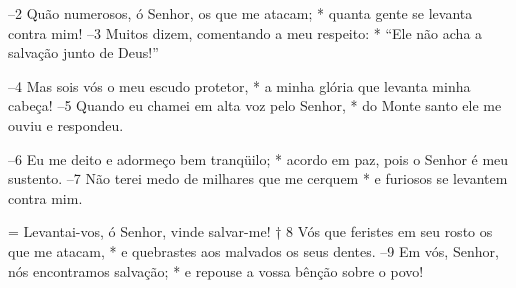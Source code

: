 –2 Quão numerosos, ó Senhor, os que me atacam; *
quanta gente se levanta contra mim! 
–3 Muitos dizem, comentando a meu respeito: *
“Ele não acha a salvação junto de Deus!”

–4 Mas sois vós o meu escudo protetor, *
a minha glória que levanta minha cabeça! 
–5 Quando eu chamei em alta voz pelo Senhor, *
do Monte santo ele me ouviu e respondeu.

–6 Eu me deito e adormeço bem tranqüilo; *
acordo em paz, pois o Senhor é meu sustento. 
–7 Não terei medo de milhares que me cerquem *
e furiosos se levantem contra mim.

= Levantai-vos, ó Senhor, vinde salvar-me! † 
8 Vós que feristes em seu rosto os que me atacam, * 
e quebrastes aos malvados os seus dentes. 
–9 Em vós, Senhor, nós encontramos salvação; *
e repouse a vossa bênção sobre o povo!